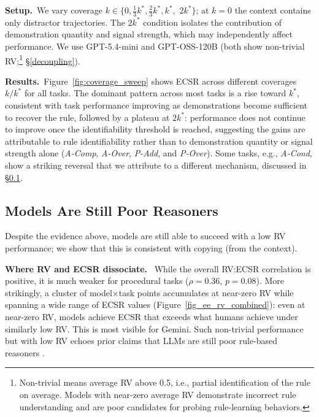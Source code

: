 \documentclass[11pt]{article}
\begin{document}
\noindent\textbf{Setup.}~We vary coverage $k \in \{0, \frac{1}{3}k^*, \frac{2}{3}k^*, k^*,$ $2k^*\}$; at $k{=}0$ the context contains only distractor trajectories. The $2k^*$ condition isolates the contribution of demonstration quantity and signal strength, which may independently affect performance. We use GPT-5.4-mini and GPT-OSS-120B (both show non-trivial RV;\footnote{Non-trivial means average RV above 0.5, i.e., partial identification of the rule on average. Models with near-zero average RV demonstrate incorrect rule understanding and are poor candidates for probing rule-learning behaviors.} \S\ref{decoupling}). 


\noindent\textbf{Results.}~Figure~\ref{fig:coverage_sweep} shows ECSR across different coverages $k/k^*$ for all tasks.
The dominant pattern across most tasks is a rise toward $k^*$, consistent with task performance improving as demonstrations become sufficient to recover the rule, followed by a plateau at $2k^*$: performance does not continue to improve once the identifiability threshold is reached, suggesting the gains are attributable to rule identifiability rather than to demonstration quantity or signal strength alone (\textit{A-Comp}, \textit{A-Over}, \textit{P-Add}, and \textit{P-Over}).
Some tasks, e.g., \textit{A-Cond}, show a striking reversal that we attribute to a different mechanism, discussed in \S\ref{sec:complications}.


\subsection{Models Are Still Poor Reasoners}
\label{sec:complications}
Despite the evidence above, models are still able to succeed with a low RV performance; we show that this is consistent with copying (from the context).

\noindent\textbf{Where RV and ECSR dissociate.}~
While the overall RV:ECSR correlation is positive, it is much weaker for procedural tasks ($\rho=0.36$, $p=0.08$). More strikingly, a cluster of model$\times$task points accumulates at near-zero RV while spanning a wide range of ECSR values (Figure~\ref{fig_ee_rv_combined}): even at near-zero RV, models achieve ECSR that exceeds what humans achieve under similarly low RV. This is most visible for Gemini.
Such non-trivial performance but with low RV echoes prior claims that LLMs are still poor rule-based reasoners \citep{li2025mirage}.
\end{document}
